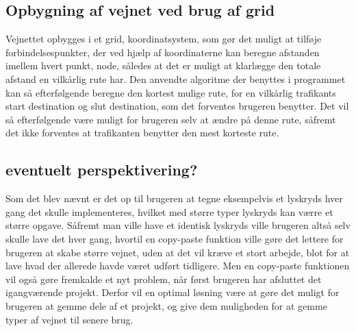 \subsection{Opbygning af vejnet ved brug af grid}
Vejnettet opbygges i et grid, koordinatsystem, som gør det muligt at tilføje forbindelsespunkter, der ved hjælp af koordinaterne kan beregne afstanden imellem hvert punkt, node, således at det er muligt at klarlægge den totale afstand en vilkårlig rute har. Den anvendte algoritme der benyttes i programmet kan så efterfølgende beregne den kortest mulige rute, for en vilkårlig trafikants start destination og slut destination, som det forventes brugeren benytter. Det vil så efterfølgende være muligt for brugeren selv at ændre på denne rute, såfremt det ikke forventes at trafikanten benytter den mest korteste rute.

\subsection{eventuelt perspektivering?}
Som det blev nævnt er det op til brugeren at tegne eksempelvis et lyskryds hver gang det skulle implementeres, hvilket med større typer lyskryds kan værre et større opgave. Såfremt man ville have et identisk lyskryds ville brugeren altså selv skulle lave det hver gang, hvortil en copy-paste funktion ville gøre det lettere for brugeren at skabe større vejnet, uden at det vil kræve et stort arbejde, blot for at lave hvad der allerede havde været udført tidligere. Men en copy-paste funktionen vil også gøre fremkalde et nyt problem, når først brugeren har afsluttet det igangværende projekt. Derfor vil en optimal løsning være at gøre det muligt for brugeren at gemme dele af et projekt, og give dem muligheden for at gemme typer af vejnet til senere brug. 